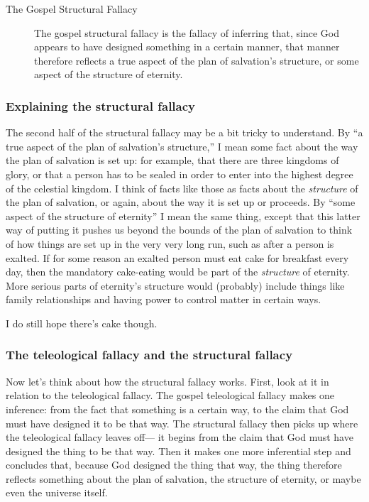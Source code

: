 		\begin{description}
				\item[The Gospel Structural Fallacy] The gospel structural fallacy is the fallacy of inferring that, since God appears to have designed something in a certain manner, that manner therefore reflects a true aspect of the plan of salvation's structure, or some aspect of the structure of eternity.
			\end{description}
	
	\subsubsection{Explaining the structural fallacy}
	
		The second half of the structural fallacy may be a bit tricky to understand.
		By ``a true aspect of the plan of salvation's structure,''
			I mean some fact about the way the plan of salvation is set up:
				for example,
					that there are three kingdoms of glory,
						or that a person has to be sealed in order to enter into the highest degree of the celestial kingdom.
		I think of facts like those as facts about the \textit{structure} of the plan of salvation,
			or again,
				about the way it is set up or proceeds.
		By ``some aspect of the structure of eternity'' I mean the same thing,
			except that this latter way of putting it pushes us beyond the bounds of the plan of salvation to think of how things are set up in the very very long run,
				such as after a person is exalted.
		If for some reason an exalted person must eat cake for breakfast every day,
			then the mandatory cake-eating would be part of the \textit{structure} of eternity.
		More serious parts of eternity's structure would (probably) include things like family relationships and having power to control matter in certain ways.
		
		I do still hope there's cake though.
	
	\subsubsection{The teleological fallacy and the structural fallacy}
	
		Now let's think about how the structural fallacy works.
		First,
			look at it in relation to the teleological fallacy.
		The gospel teleological fallacy makes one inference:
			from the fact that something is a certain way,
				to the claim that God must have designed it to be that way.
		The structural fallacy then picks up where the teleological fallacy leaves off---%
			it begins from the claim that God must have designed the thing to be that way.
		Then it makes one more inferential step and concludes that,
			because God designed the thing that way,
				the thing therefore reflects something about the plan of salvation,
					the structure of eternity,
						or maybe even the universe itself.
		
